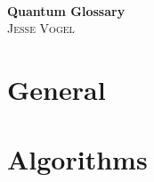 \documentclass[10pt]{report}
\begin{document}
\thispagestyle{empty}

\begin{center}
    \; \\ \vspace{4cm} \textbf{\Huge Quantum Glossary}
    \\ \vspace{2cm}
    \textsc{Jesse Vogel}
\end{center}

\newpage

{
    \tableofcontents
}

\newcommand{\cat}{}

\chapter{General}
\renewcommand{\cat}{GEN}


\chapter{Algorithms}
\renewcommand{\cat}{ALG}

\end{document}
